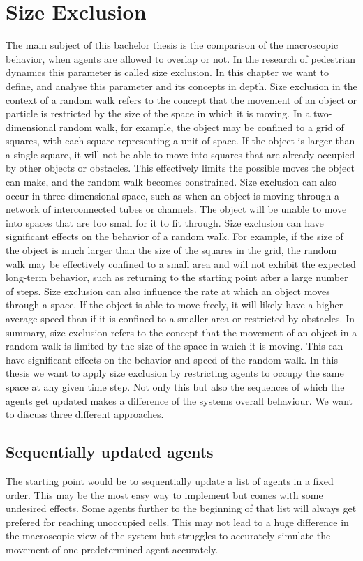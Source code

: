 \newpage
\section{Size Exclusion}
The main subject of this bachelor thesis is the comparison of the macroscopic behavior, when agents are allowed to overlap or not.
In the research of pedestrian dynamics this parameter is called size exclusion. In this chapter we want to define, and analyse this parameter and its concepts in depth. 
Size exclusion in the context of a random walk refers to the concept that the movement of an object or particle is restricted by the size of the space in which it is moving.
In a two-dimensional random walk, for example, the object may be confined to a grid of squares, with each square representing a unit of space. If the object is larger than a single square, it will not be able to move into squares that are already occupied by other objects or obstacles. This effectively limits the possible moves the object can make, and the random walk becomes constrained.
Size exclusion can also occur in three-dimensional space, such as when an object is moving through a network of interconnected tubes or channels. The object will be unable to move into spaces that are too small for it to fit through.
Size exclusion can have significant effects on the behavior of a random walk. For example, if the size of the object is much larger than the size of the squares in the grid, the random walk may be effectively confined to a small area and will not exhibit the expected long-term behavior, such as returning to the starting point after a large number of steps.
Size exclusion can also influence the rate at which an object moves through a space. If the object is able to move freely, it will likely have a higher average speed than if it is confined to a smaller area or restricted by obstacles.
In summary, size exclusion refers to the concept that the movement of an object in a random walk is limited by the size of the space in which it is moving. This can have significant effects on the behavior and speed of the random walk.
In this thesis we want to apply size exclusion by restricting agents to occupy the same space at any given time step.
Not only this but also the sequences of which the agents get updated makes a difference of the systems overall behaviour.
We want to discuss three different approaches.

\subsection{Sequentially updated agents}
The starting point would be to sequentially update a list of agents in a fixed order. This may be the most easy way to implement but comes with some undesired effects. 
Some agents further to the beginning of that list will always get prefered for reaching unoccupied cells. This may not lead to a huge difference in the macroscopic view of the system but struggles to accurately simulate the movement of one predetermined agent accurately.

